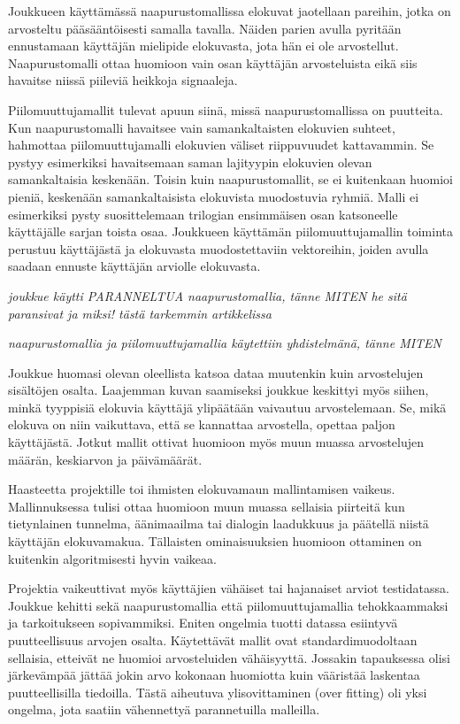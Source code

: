 \documentclass[12pt,finnish]{tktltiki2}
\theoremstyle{definition}
\theoremstyle{remark}
\begin{document}
Joukkueen käyttämässä naapurustomallissa elokuvat jaotellaan pareihin, jotka on arvosteltu pääsääntöisesti samalla tavalla. Näiden parien avulla pyritään ennustamaan käyttäjän mielipide elokuvasta, jota hän ei ole arvostellut. Naapurustomalli ottaa huomioon vain osan käyttäjän arvosteluista eikä siis havaitse niissä piileviä heikkoja signaaleja.

        Piilomuuttujamallit tulevat apuun siinä, missä naapurustomallissa on puutteita. Kun naapurustomalli havaitsee vain samankaltaisten elokuvien suhteet, hahmottaa piilomuuttujamalli elokuvien väliset riippuvuudet kattavammin. Se pystyy esimerkiksi havaitsemaan saman lajityypin elokuvien olevan samankaltaisia keskenään. Toisin kuin naapurustomallit, se ei kuitenkaan huomioi pieniä, keskenään samankaltaisista elokuvista muodostuvia ryhmiä. Malli ei esimerkiksi pysty suosittelemaan trilogian ensimmäisen osan katsoneelle käyttäjälle sarjan toista osaa. Joukkueen käyttämän piilomuuttujamallin toiminta perustuu käyttäjästä ja elokuvasta muodostettaviin vektoreihin, joiden avulla saadaan ennuste käyttäjän arviolle elokuvasta.
        
        \textit{joukkue käytti PARANNELTUA naapurustomallia, tänne MITEN he sitä paransivat ja miksi! tästä tarkemmin artikkelissa \cite{Koren:2008:FMN:1401890.1401944}}
        
        \textit{naapurustomallia ja piilomuuttujamallia käytettiin yhdistelmänä, tänne MITEN}
        
        Joukkue huomasi olevan oleellista katsoa dataa muutenkin kuin arvostelujen sisältöjen osalta. Laajemman kuvan saamiseksi joukkue keskittyi myös siihen, minkä tyyppisiä elokuvia käyttäjä ylipäätään vaivautuu arvostelemaan. Se, mikä elokuva on niin vaikuttava, että se kannattaa arvostella, opettaa paljon käyttäjästä. Jotkut mallit ottivat huomioon myös muun muassa arvostelujen määrän, keskiarvon ja päivämäärät.
        
Haasteetta projektille toi ihmisten elokuvamaun mallintamisen vaikeus. Mallinnuksessa tulisi ottaa huomioon muun muassa sellaisia piirteitä kun tietynlainen tunnelma, äänimaailma tai dialogin laadukkuus ja päätellä niistä käyttäjän elokuvamakua. Tällaisten ominaisuuksien huomioon ottaminen on kuitenkin algoritmisesti hyvin vaikeaa.
        
        Projektia vaikeuttivat myös käyttäjien vähäiset tai hajanaiset arviot testidatassa. Joukkue kehitti sekä naapurustomallia että piilomuuttujamallia tehokkaammaksi ja tarkoitukseen sopivammiksi. Eniten ongelmia tuotti datassa esiintyvä puutteellisuus arvojen osalta. Käytettävät mallit ovat standardimuodoltaan sellaisia, etteivät ne huomioi arvosteluiden vähäisyyttä. Jossakin tapauksessa olisi järkevämpää jättää jokin arvo kokonaan huomiotta kuin vääristää laskentaa puutteellisilla tiedoilla. Tästä aiheutuva ylisovittaminen (over fitting) oli yksi ongelma, jota saatiin vähennettyä parannetuilla malleilla.
        
\end{document}
